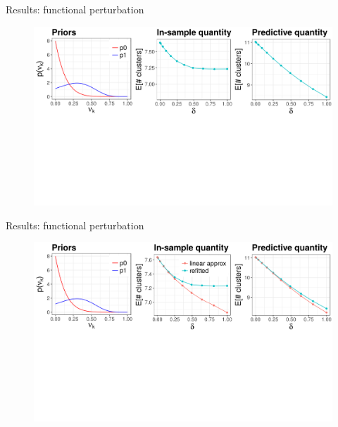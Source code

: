 \documentclass[10pt]{beamer}\usepackage[]{graphicx}\usepackage[]{color}
\newenvironment{knitrout}{}{} %
\begin{document}
\begin{frame}{Results: functional perturbation}
\begin{figure}
\centering
\begin{knitrout}
\color{fgcolor}
{\centering \includegraphics[width=0.98\linewidth,height=0.588\linewidth]{masked_results_fig/fun_sens_masked_2} 
}
\end{knitrout}
\end{figure}
\end{frame}

\begin{frame}{Results: functional perturbation}
\begin{figure}
\centering
\begin{knitrout}
\color{fgcolor}
{\centering \includegraphics[width=0.98\linewidth,height=0.588\linewidth]{masked_results_fig/fun_sens_masked_3} 
}
\end{knitrout}
\end{figure}
\end{frame}
\end{document}
